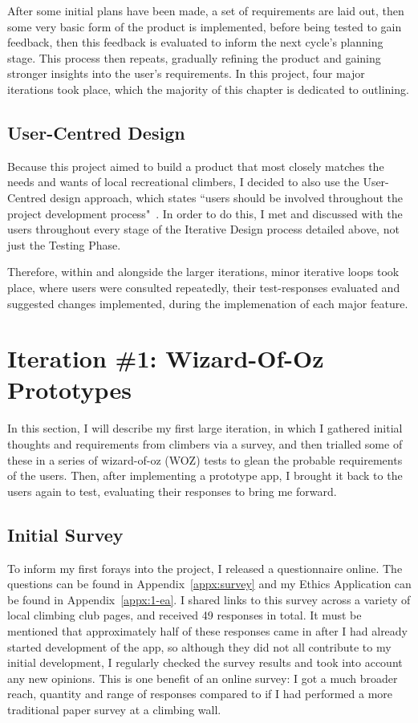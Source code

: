 After some initial plans have been made, a set of requirements are laid out, then some very basic form of the product is implemented, before being tested to gain feedback, then this feedback is evaluated to inform the next cycle's planning stage.
This process then repeats, gradually refining the product and gaining stronger insights into the user's requirements.
In this project, four major iterations took place, which the majority of this chapter is dedicated to outlining.


\subsection{User-Centred Design}
Because this project aimed to build a product that most closely matches the needs and wants of local recreational climbers, I decided to also use the User-Centred design approach, which states ``users should be involved throughout the project development
process"~\cite{ISO9241-210}.
In order to do this, I met and discussed with the users throughout every stage of the Iterative Design process detailed above, not just the Testing Phase.

Therefore, within and alongside the larger iterations, minor iterative loops took place, where users were consulted repeatedly, their test-responses evaluated and suggested changes implemented, during the implemenation of each major feature.



\section{Iteration \#1: Wizard-Of-Oz Prototypes}
In this section, I will describe my first large iteration, in which I gathered initial thoughts and requirements from climbers via a survey, and then trialled some of these in a series of wizard-of-oz (WOZ) tests to glean the probable requirements of the users.
Then, after implementing a prototype app, I brought it back to the users again to test, evaluating their responses to bring me forward.


\subsection{Initial Survey}
To inform my first forays into the project, I released a questionnaire online.
The questions can be found in Appendix~\ref{appx:survey} and my Ethics Application can be found in Appendix~\ref{appx:1-ea}.
I shared links to this survey across a variety of local climbing club pages, and received 49 responses in total. 
It must be mentioned that approximately half of these responses came in after I had already started development of the app, so although they did not all contribute to my initial development, I regularly checked the survey results and took into account any new opinions.
This is one benefit of an online survey: I got a much broader reach, quantity and range of responses compared to if I had performed a more traditional paper survey at a climbing wall.


